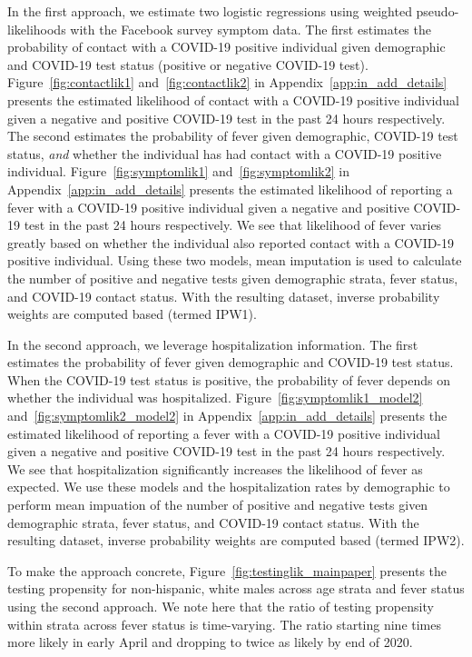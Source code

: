 \documentclass[11pt]{amsart}
\numberwithin{equation}{section}
\theoremstyle{plain}
\begin{document}
In the first approach, we estimate two logistic regressions using weighted pseudo-likelihoods with the Facebook survey symptom data.  The first estimates the probability of contact with a COVID-19 positive individual given demographic and COVID-19 test status (positive or negative COVID-19 test). Figure~\ref{fig:contactlik1} and~\ref{fig:contactlik2} in Appendix~\ref{app:in_add_details} presents the estimated likelihood of contact with a COVID-19 positive individual given a negative and positive COVID-19 test in the past 24 hours respectively.  The second estimates the probability of fever given demographic, COVID-19 test status, \emph{and} whether the individual has had contact with a COVID-19 positive individual.  Figure~\ref{fig:symptomlik1} and~\ref{fig:symptomlik2} in Appendix~\ref{app:in_add_details} presents the estimated likelihood of reporting a fever with a COVID-19 positive individual given a negative and positive COVID-19 test in the past 24 hours respectively.  We see that likelihood of fever varies greatly based on whether the individual also reported contact with a COVID-19 positive individual. Using these two models, mean imputation is used to calculate the number of positive and negative tests given demographic strata, fever status, and COVID-19 contact status. With the resulting dataset, inverse probability weights are computed based (termed IPW1).


In the second approach, we leverage hospitalization information. The first estimates the probability of fever given demographic and COVID-19 test status.  When the COVID-19 test status is positive, the probability of fever depends on whether the individual was hospitalized.  Figure~\ref{fig:symptomlik1_model2} and~\ref{fig:symptomlik2_model2} in Appendix~\ref{app:in_add_details} presents the estimated likelihood of reporting a fever with a COVID-19 positive individual given a negative and positive COVID-19 test in the past 24 hours respectively.  We see that hospitalization significantly increases the likelihood of fever as expected.  We use these models and the hospitalization rates by demographic to perform mean impuation of the number of positive and negative tests given demographic strata, fever status, and COVID-19 contact status. With the resulting dataset, inverse probability weights are computed based (termed IPW2).

To make the approach concrete, Figure~\ref{fig:testinglik_mainpaper} presents the testing propensity for non-hispanic, white males across age strata and fever status using the second approach.  We note here that the ratio of testing propensity within strata across fever status is time-varying.  The ratio starting nine times more likely in early April and dropping to twice as likely by end of 2020.
\end{document}
